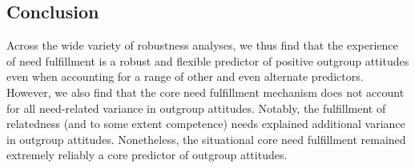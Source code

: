 \documentclass[man, 12pt, a4paper, mask]{apa7}
\theoremstyle{break}
\theoremstyle{plain}
\begin{document}





\subsection{Conclusion}
Across the wide variety of robustness analyses, we thus find that the experience of need fulfillment is a robust and flexible predictor of positive outgroup attitudes even when accounting for a range of other and even alternate predictors. However, we also find that the core need fulfillment mechanism does not account for all need-related variance in outgroup attitudes. Notably, the fulfillment of relatedness (and to some extent competence) needs explained additional variance in outgroup attitudes. Nonetheless, the situational core need fulfillment remained extremely reliably a core predictor of outgroup attitudes.



\end{document}
